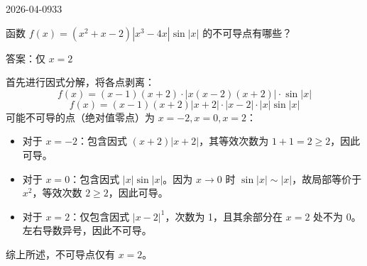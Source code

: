 \begin{mistake}{2026-04-09}{33}

\begin{problemcontent}
函数 \( f(x) = (x^2+x-2)|x^3-4x|\sin|x| \) 的不可导点有哪些？
\end{problemcontent}

\begin{solutioncontent}
答案：仅 \( x=2 \)

首先进行因式分解，将各点剥离：
\[
f(x) = (x-1)(x+2) \cdot |x(x-2)(x+2)| \cdot \sin|x|
\]
\[
f(x) = (x-1)(x+2)|x+2| \cdot |x-2| \cdot |x|\sin|x|
\]
可能不可导的点（绝对值零点）为 \( x=-2, x=0, x=2 \)：
\begin{itemize}
 \item 对于 \( x=-2 \)：包含因式 \( (x+2)|x+2| \)，其等效次数为 \( 1+1 = 2 \ge 2 \)，因此可导。
 \item 对于 \( x=0 \)：包含因式 \( |x|\sin|x| \)。因为 \( x \to 0 \) 时 \( \sin|x| \sim |x| \)，故局部等价于 \( x^2 \)，等效次数 \( 2 \ge 2 \)，因此可导。
 \item 对于 \( x=2 \)：仅包含因式 \( |x-2|^1 \)，次数为 1，且其余部分在 \( x=2 \) 处不为 0。左右导数异号，因此不可导。
\end{itemize}
综上所述，不可导点仅有 \( x=2 \)。
\end{solutioncontent}


\end{mistake}
